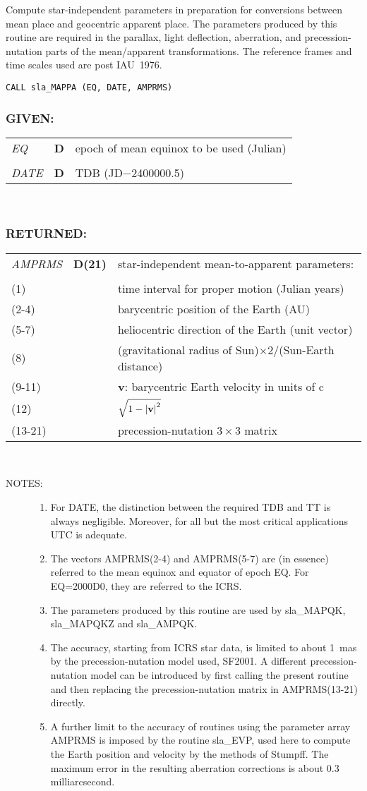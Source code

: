 \documentclass[11pt,twoside,nolof]{starlink}
\providecommand{\action}[1]
{\item[ACTION:] #1}
\providecommand{\call}[1]
{\item[CALL:] \texttt{#1}}
\newcommand{\args}[2]{
  \subsubsection*{#1:}
     \begin{tabular}{p{7em}p{6em}p{22em}}
       #2
     \end{tabular}\\
}
\newcommand{\spec}[3]
{
  \emph{{#1}} & {\textbf{\mbox{#2}}} & {#3} \\
}
\newcommand{\specel}[2]
{
  {#1} &  & {#2}
}
\newcommand{\notes}[1]
 {
   \begin{description}
     \item[NOTES:]
         #1
   \end{description}
}
\begin{document}
{
 \action{Compute star-independent parameters in preparation for
         conversions between mean place and geocentric apparent place.
         The parameters produced by this routine are required in the
         parallax, light deflection, aberration, and precession-nutation
         parts of the mean/apparent transformations.
         The reference frames and time scales used are post IAU~1976.}
 \call{CALL sla\_MAPPA (EQ, DATE, AMPRMS)}
}
\args{GIVEN}
{
 \spec{EQ}{D}{epoch of mean equinox to be used (Julian)} \\
 \spec{DATE}{D}{TDB (JD$-$2400000.5)}
}
\args{RETURNED}
{
 \spec{AMPRMS}{D(21)}{star-independent mean-to-apparent parameters:} \\
 \specel   {(1)}     {time interval for proper motion (Julian years)} \\
 \specel   {(2-4)}   {barycentric position of the Earth (AU)} \\
 \specel   {(5-7)}   {heliocentric direction of the Earth (unit vector)} \\
 \specel   {(8)}     {(gravitational radius of
                      Sun)$\times 2 / $(Sun-Earth distance)} \\
 \specel   {(9-11)}  {\textbf{v}: barycentric Earth velocity in units of c} \\
 \specel   {(12)}    {$\sqrt{1-\left|\mbox{\textbf{v}}\right|^2}$} \\
 \specel   {(13-21)} {precession-nutation $3\times3$ matrix}
}
\notes
{
 \begin{enumerate}
  \item For DATE, the distinction between the required TDB and TT
        is always negligible.  Moreover, for all but the most
        critical applications UTC is adequate.
  \item The vectors AMPRMS(2-4) and AMPRMS(5-7) are
        (in essence) referred to
        the mean equinox and equator of epoch EQ.  For
        EQ=2000D0, they are referred to the ICRS.
  \item The parameters produced by this routine are used by
        sla\_MAPQK, sla\_MAPQKZ and sla\_AMPQK.
  \item The accuracy, starting from ICRS star data,
        is limited to about 1~mas by the precession-nutation
        model used, SF2001.  A different precession-nutation model
        can be introduced by first calling the present routine
        and then replacing the precession-nutation
        matrix in AMPRMS(13-21) directly.
  \item A further limit to the accuracy of routines using the
        parameter array AMPRMS is
        imposed by the routine sla\_EVP, used here to compute the
        Earth position and velocity by the methods of Stumpff.
        The maximum error in the resulting aberration corrections is
        about 0.3 milliarcsecond.
 \end{enumerate}
}
\end{document}

